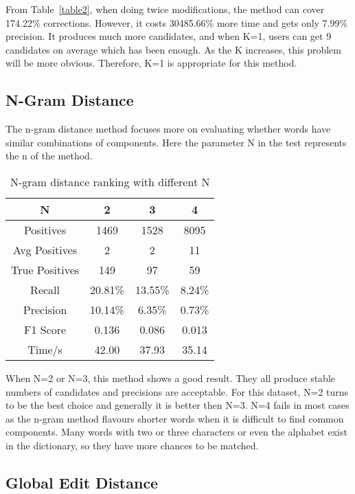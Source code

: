\documentclass[11pt]{article}
\begin{document}
From Table~\ref{table2}, when doing twice modifications, the method can cover 174.22\% corrections. However, it costs 30485.66\% more time and gets only 7.99\% precision. It produces much more candidates, and when K=1, users can get 9 candidates on average which has been enough. As the K increases, this problem will be more obvious. Therefore, K=1 is appropriate for this method. 

\subsection{N-Gram Distance}

The n-gram distance method focuses more on evaluating whether words have similar combinations of components. Here the parameter N in the test represents the n of the method.

\begin{table}[h]
 \begin{center}
\begin{tabular}{ |c||c|c|c| }
      \hline
      N & 2 & 3 & 4\\
      \hline
      Positives & 1469 & 1528 & 8095\\
      Avg Positives & 2 & 2 & 11\\
      True Positives & 149 & 97 &59\\
      Recall & 20.81\% & 13.55\% & 8.24\%\\
      Precision & 10.14\% & 6.35\% & 0.73\%\\
      F1 Score & 0.136 & 0.086 & 0.013\\
      Time/s & 42.00 & 37.93 & 35.14\\
      \hline
\end{tabular}
\caption{N-gram distance ranking with different N}\label{table3}
 \end{center}
\end{table}

When N=2 or N=3, this method shows a good result. They all produce stable numbers of candidates and precisions are acceptable. For this dataset, N=2 turns to be the best choice and generally it is better then N=3. N=4 fails in most cases as the n-gram method flavours shorter words when it is difficult to find common components. Many words with two or three characters or even the alphabet exist in the dictionary, so they have more chances to be matched. 

\subsection{Global Edit Distance}
\end{document}
